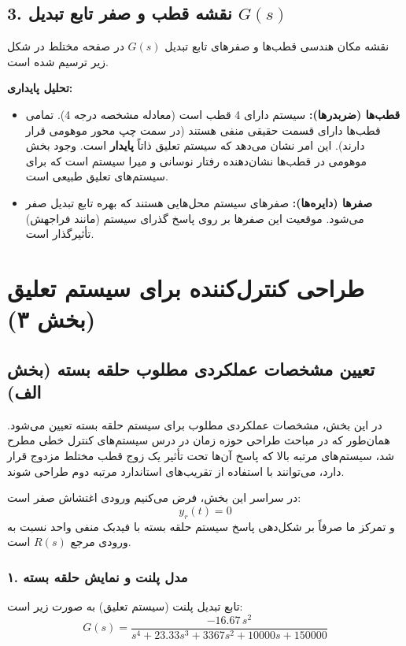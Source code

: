 \documentclass[a4paper]{article}
\begin{document}
	\subsection{3. نقشه قطب و صفر تابع تبدیل $G(s)$}
	نقشه مکان هندسی قطب‌ها و صفرهای تابع تبدیل $G(s)$ در صفحه مختلط  در شکل زیر ترسیم شده است.
	
	

		\newpage
	
	\textbf{تحلیل پایداری:}
	\begin{itemize}
		\item \textbf{قطب‌ها (ضربدرها):} سیستم دارای 4 قطب است (معادله مشخصه درجه 4). تمامی قطب‌ها دارای قسمت حقیقی منفی هستند (در سمت چپ محور موهومی قرار دارند). این امر نشان می‌دهد که سیستم تعلیق ذاتاً \textbf{پایدار} است. وجود بخش موهومی در قطب‌ها نشان‌دهنده رفتار نوسانی و میرا  سیستم است که برای سیستم‌های تعلیق طبیعی است.
		\item \textbf{صفرها (دایره‌ها):} صفرهای سیستم محل‌هایی هستند که بهره تابع تبدیل صفر می‌شود. موقعیت این صفرها بر روی پاسخ گذرای سیستم (مانند فراجهش) تأثیرگذار است.
	\end{itemize}
	

\section{طراحی کنترل‌کننده برای سیستم تعلیق (بخش ۳)}

\subsection{تعیین مشخصات عملکردی مطلوب حلقه بسته (بخش الف)}

در این بخش، مشخصات عملکردی مطلوب برای سیستم حلقه بسته تعیین می‌شود. همان‌طور که در مباحث طراحی حوزه زمان در درس سیستم‌های کنترل خطی مطرح شد، سیستم‌های مرتبه بالا که پاسخ آن‌ها تحت تأثیر یک زوج قطب مختلط مزدوج قرار دارد، می‌توانند با استفاده از تقریب‌های استاندارد مرتبه دوم طراحی شوند.

در سراسر این بخش، فرض می‌کنیم ورودی اغتشاش صفر است:
\[
y_r(t) = 0
\]
و تمرکز ما صرفاً بر شکل‌دهی پاسخ سیستم حلقه بسته با فیدبک منفی واحد نسبت به ورودی مرجع $R(s)$ است.

\subsubsection*{۱. مدل پلنت و نمایش حلقه بسته}

تابع تبدیل پلنت (سیستم تعلیق) به صورت زیر است:
\[
G(s)=\frac{-16.67\,s^2}{s^4 + 23.33s^3 + 3367s^2 + 10000s + 150000}
\]
\end{document}
